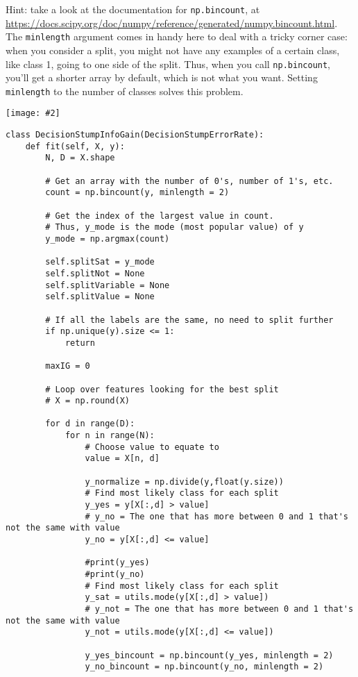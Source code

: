 \documentclass{article}
\newcommand{\centerfig}[2]{\begin{center}\texttt{[image: \#2]}\end{center}}
\begin{document}
Hint: take a look at the documentation for \texttt{np.bincount}, at \\
\url{https://docs.scipy.org/doc/numpy/reference/generated/numpy.bincount.html}. 
The \texttt{minlength} argument comes in handy here to deal with a tricky corner case:
when you consider a split, you might not have any examples of a certain class, like class 1,
going to one side of the split. Thus, when you call \texttt{np.bincount}, you'll get
a shorter array by default, which is not what you want. Setting \texttt{minlength} to the 
number of classes solves this problem.
\centerfig{0.7}{./figs/q6_3_decisionBoundary}
\begin{lstlisting}
class DecisionStumpInfoGain(DecisionStumpErrorRate):
    def fit(self, X, y):
        N, D = X.shape

        # Get an array with the number of 0's, number of 1's, etc.
        count = np.bincount(y, minlength = 2)    
        
        # Get the index of the largest value in count.  
        # Thus, y_mode is the mode (most popular value) of y
        y_mode = np.argmax(count) 

        self.splitSat = y_mode
        self.splitNot = None
        self.splitVariable = None
        self.splitValue = None

        # If all the labels are the same, no need to split further
        if np.unique(y).size <= 1:
            return

        maxIG = 0

        # Loop over features looking for the best split
        # X = np.round(X)

        for d in range(D):
            for n in range(N):
                # Choose value to equate to
                value = X[n, d]

                y_normalize = np.divide(y,float(y.size))
                # Find most likely class for each split
                y_yes = y[X[:,d] > value]
                # y_no = The one that has more between 0 and 1 that's not the same with value
                y_no = y[X[:,d] <= value]

                #print(y_yes)
                #print(y_no)
                # Find most likely class for each split
                y_sat = utils.mode(y[X[:,d] > value])
                # y_not = The one that has more between 0 and 1 that's not the same with value
                y_not = utils.mode(y[X[:,d] <= value])

                y_yes_bincount = np.bincount(y_yes, minlength = 2)
                y_no_bincount = np.bincount(y_no, minlength = 2)


\end{lstlisting}
\end{document}
